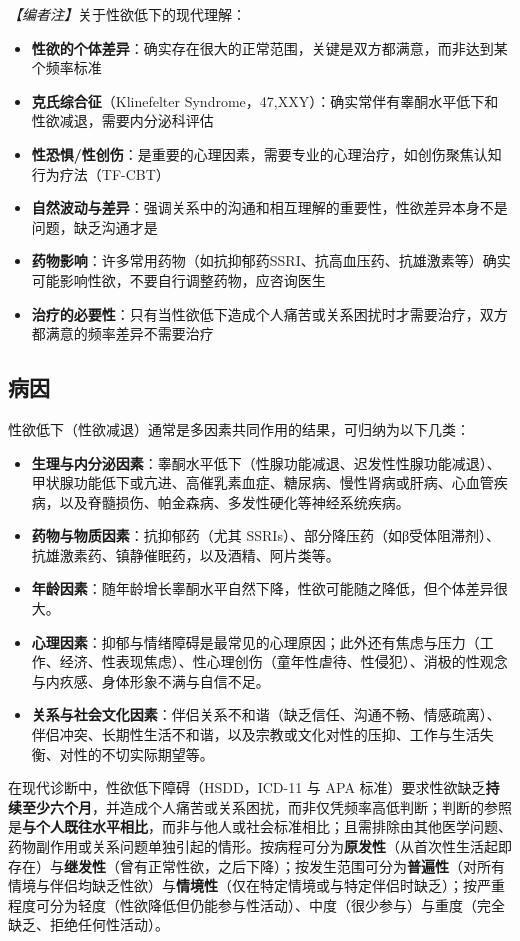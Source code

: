 \documentclass[12pt,a4paper,twoside]{ctexbook}
\begin{document}
\noindent\textit{【编者注】}关于性欲低下的现代理解：
\begin{itemize}
	\item \textbf{性欲的个体差异}：确实存在很大的正常范围，关键是双方都满意，而非达到某个频率标准
	\item \textbf{克氏综合征}（Klinefelter Syndrome，47,XXY）：确实常伴有睾酮水平低下和性欲减退，需要内分泌科评估
	\item \textbf{性恐惧/性创伤}：是重要的心理因素，需要专业的心理治疗，如创伤聚焦认知行为疗法（TF-CBT）
	\item \textbf{自然波动与差异}：强调关系中的沟通和相互理解的重要性，性欲差异本身不是问题，缺乏沟通才是
	\item \textbf{药物影响}：许多常用药物（如抗抑郁药SSRI、抗高血压药、抗雄激素等）确实可能影响性欲，不要自行调整药物，应咨询医生
	\item \textbf{治疗的必要性}：只有当性欲低下造成个人痛苦或关系困扰时才需要治疗，双方都满意的频率差异不需要治疗
\end{itemize}

\subsection{病因}
性欲低下（性欲减退）通常是多因素共同作用的结果，可归纳为以下几类：

\begin{itemize}
\item \textbf{生理与内分泌因素}：睾酮水平低下（性腺功能减退、迟发性性腺功能减退）、甲状腺功能低下或亢进、高催乳素血症、糖尿病、慢性肾病或肝病、心血管疾病，以及脊髓损伤、帕金森病、多发性硬化等神经系统疾病。
\item \textbf{药物与物质因素}：抗抑郁药（尤其 SSRIs）、部分降压药（如β受体阻滞剂）、抗雄激素药、镇静催眠药，以及酒精、阿片类等。
\item \textbf{年龄因素}：随年龄增长睾酮水平自然下降，性欲可能随之降低，但个体差异很大。
\item \textbf{心理因素}：抑郁与情绪障碍是最常见的心理原因；此外还有焦虑与压力（工作、经济、性表现焦虑）、性心理创伤（童年性虐待、性侵犯）、消极的性观念与内疚感、身体形象不满与自信不足。
\item \textbf{关系与社会文化因素}：伴侣关系不和谐（缺乏信任、沟通不畅、情感疏离）、伴侣冲突、长期性生活不和谐，以及宗教或文化对性的压抑、工作与生活失衡、对性的不切实际期望等。
\end{itemize}

在现代诊断中，性欲低下障碍（HSDD，ICD-11 与 APA 标准）要求性欲缺乏\textbf{持续至少六个月}，并造成个人痛苦或关系困扰，而非仅凭频率高低判断；判断的参照是\textbf{与个人既往水平相比}，而非与他人或社会标准相比；且需排除由其他医学问题、药物副作用或关系问题单独引起的情形。按病程可分为\textbf{原发性}（从首次性生活起即存在）与\textbf{继发性}（曾有正常性欲，之后下降）；按发生范围可分为\textbf{普遍性}（对所有情境与伴侣均缺乏性欲）与\textbf{情境性}（仅在特定情境或与特定伴侣时缺乏）；按严重程度可分为轻度（性欲降低但仍能参与性活动）、中度（很少参与）与重度（完全缺乏、拒绝任何性活动）。
\end{document}
